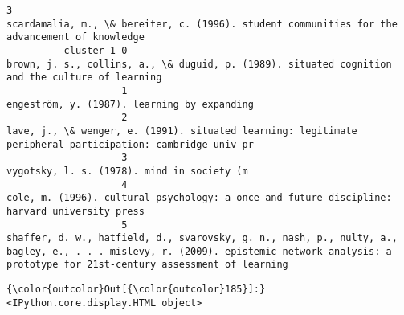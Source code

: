 \documentclass[journal,twocolumn]{IEEEtran}
\begin{document}
\begin{Verbatim}[commandchars=\\\{\}]
                    3                                                                                                                                                                                                                            scardamalia, m., \& bereiter, c. (1996). student communities for the advancement of knowledge
          cluster 1 0                                                                                                                                                                                                                          brown, j. s., collins, a., \& duguid, p. (1989). situated cognition and the culture of learning
                    1                                                                                                                                                                                                                                                                             engeström, y. (1987). learning by expanding
                    2                                                                                                                                                                                                                lave, j., \& wenger, e. (1991). situated learning: legitimate peripheral participation: cambridge univ pr
                    3                                                                                                                                                                                                                                                                              vygotsky, l. s. (1978). mind in society (m
                    4                                                                                                                                                                                                                            cole, m. (1996). cultural psychology: a once and future discipline: harvard university press
                    5                                                                                                                              shaffer, d. w., hatfield, d., svarovsky, g. n., nash, p., nulty, a., bagley, e., . . . mislevy, r. (2009). epistemic network analysis: a prototype for 21st-century assessment of learning
\end{Verbatim}
            

\begin{Verbatim}[commandchars=\\\{\}]
{\color{outcolor}Out[{\color{outcolor}185}]:} <IPython.core.display.HTML object>
\end{Verbatim}
            
\end{document}
